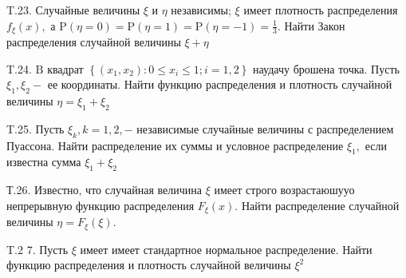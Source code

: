 \documentclass[a4paper,12pt]{article} %
\begin{document}
\begin{example}

T.23. Случайные величины $\xi$ и $\eta$ независимы; $\xi$ имеет плотность распределения $f_{\xi}(x),$ а $\mathrm{P}(\eta=0)=\mathrm{P}(\eta=1)=\mathrm{P}(\eta=-1)=\frac{1}{3} .$ Найти Закон
распределения случайной величины $\xi+\eta$




\end{example}



\begin{example}

T.24. $\mathrm{B}$ квадрат $\left\{\left(x_{1}, x_{2}\right): 0 \leqslant x_{i} \leqslant 1 ; i=1,2\right\}$ наудачу брошена точка. Пусть $\xi_{1}, \xi_{2}-$ ее координаты. Найти функцию распределения и плотность случайной величины $\eta=\xi_{1}+\xi_{2}$




\end{example}



\begin{example}


T.25. Пусть $\xi_{k}, k=1,2,-$ независимые случайные величины с распределением Пуассона. Найти распределение их суммы и условное распределение $\xi_{1},$ если известна сумма $\xi_{1}+\xi_{2}$



\end{example}





\begin{example}

Т.26. Известно, что случайная величина $\xi$ имеет строго возрастаюшууо непрерывную функцию распределения $F_{\xi}(x) .$ Найти распределение случайной величины $\eta=F_{\xi}(\xi) .$




\end{example}





\begin{example}

T.2 7. Пусть $\xi$ имеет имеет стандартное нормальное распределение. Найти функцию распределения и плотность случайной величины $\xi^{2}$




\end{example}
\end{document}
